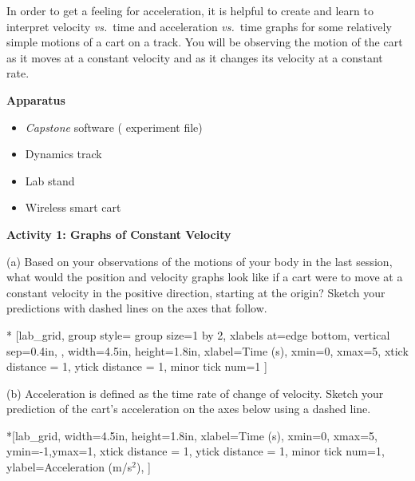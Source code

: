 In order to get a feeling for acceleration, it is helpful to create and learn
to interpret velocity \textit{vs.}~time and acceleration \textit{vs.}~time graphs for some relatively simple motions of a cart on a track. You will be observing the motion of the cart as it moves at a constant velocity and as it changes its velocity at a constant rate. 

\bigskip
\textbf{Apparatus} 
\vspace{-\parskip}
\begin{itemize} 
\item \textit{Capstone} software ( experiment file)
\item Dynamics track
\item Lab stand
\item Wireless smart cart  
\end{itemize}

\textbf{Activity 1: Graphs of Constant Velocity} 

(a) Based on your observations of the motions of your body in the last session, what would the position and velocity graphs look like if a cart were to move at a constant velocity in the positive direction, starting at the origin? Sketch your predictions with dashed lines on the axes that follow.


\begin{lab_groupplot}*{}
					[lab_grid,
	group style={
		group size=1 by 2,
		xlabels at=edge bottom,
		vertical sep=0.4in,
		},
	width=4.5in, height=1.8in,
	xlabel=Time (s),
	xmin=0, xmax=5,
	xtick distance = 1, 
	ytick distance = 1, 
	minor tick num=1
	]
\nextgroupplot[
	ymin=0,ymax=2, 
	ylabel={Position (m)},
	ylabel_align={-1},
	]
\nextgroupplot[
	ymin=-1,ymax=1, 
	ylabel={Velocity (m/s)},
	]
\end{lab_groupplot}

(b) Acceleration is defined as the time rate of change of velocity. Sketch your
prediction of the cart's acceleration on the axes below using a dashed line.

\begin{lab_axis}*[lab_grid,
	width=4.5in, height=1.8in,
	xlabel={Time (s)},
	xmin=0, xmax=5,
	ymin=-1,ymax=1, 
	xtick distance = 1, 
	ytick distance = 1, 
	minor tick num=1,
	ylabel={Acceleration (m/s$^2$)},
	]
\end{lab_axis}

